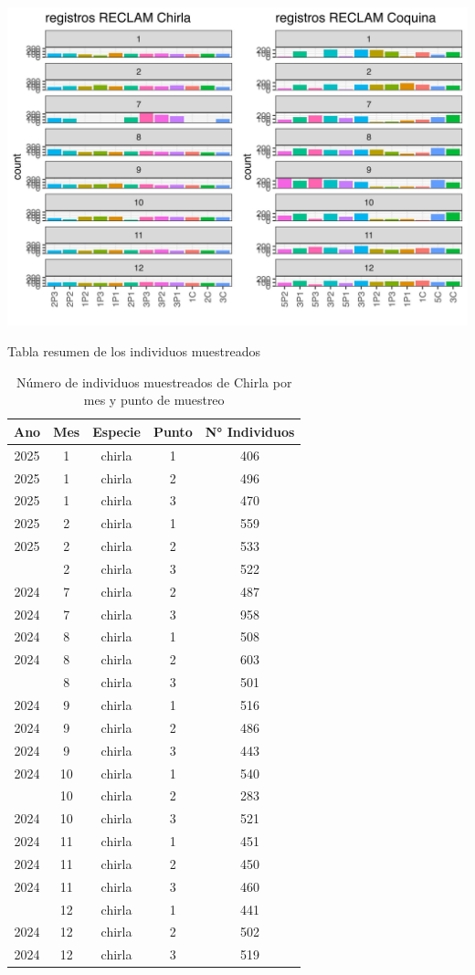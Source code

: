 \documentclass[
]{article}
\begin{document}
\begin{center}\includegraphics{AED_Biologico_files/figure-latex/unnamed-chunk-7-1} \end{center}

Tabla resumen de los individuos muestreados

\begin{table}

\caption{\label{tab:unnamed-chunk-9}Número de individuos muestreados de Chirla por mes y punto de muestreo}
\centering
\begin{tabular}[t]{ccccc}
\toprule
Ano & Mes & Especie & Punto & N° Individuos\\
\midrule
2025 & 1 & chirla & 1 & 406\\
2025 & 1 & chirla & 2 & 496\\
2025 & 1 & chirla & 3 & 470\\
2025 & 2 & chirla & 1 & 559\\
2025 & 2 & chirla & 2 & 533\\
\addlinespace
2025 & 2 & chirla & 3 & 522\\
2024 & 7 & chirla & 2 & 487\\
2024 & 7 & chirla & 3 & 958\\
2024 & 8 & chirla & 1 & 508\\
2024 & 8 & chirla & 2 & 603\\
\addlinespace
2024 & 8 & chirla & 3 & 501\\
2024 & 9 & chirla & 1 & 516\\
2024 & 9 & chirla & 2 & 486\\
2024 & 9 & chirla & 3 & 443\\
2024 & 10 & chirla & 1 & 540\\
\addlinespace
2024 & 10 & chirla & 2 & 283\\
2024 & 10 & chirla & 3 & 521\\
2024 & 11 & chirla & 1 & 451\\
2024 & 11 & chirla & 2 & 450\\
2024 & 11 & chirla & 3 & 460\\
\addlinespace
2024 & 12 & chirla & 1 & 441\\
2024 & 12 & chirla & 2 & 502\\
2024 & 12 & chirla & 3 & 519\\
\bottomrule
\end{tabular}
\end{table}
\end{document}

